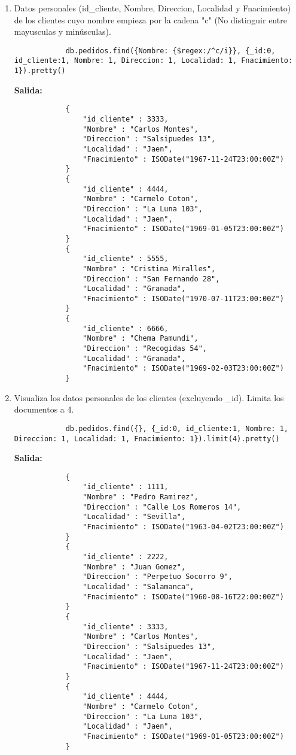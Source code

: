 \begin{enumerate}
	\item Datos personales (id\_cliente, Nombre, Direccion, Localidad y Fnacimiento) de los clientes cuyo nombre empieza por la cadena "c" (No distinguir entre mayusculas y minúsculas).
		\begin{lstlisting}
			db.pedidos.find({Nombre: {$regex:/^c/i}}, {_id:0, id_cliente:1, Nombre: 1, Direccion: 1, Localidad: 1, Fnacimiento: 1}).pretty()
		\end{lstlisting}
		\textbf{Salida:}
		\begin{lstlisting}
			{
				"id_cliente" : 3333,
				"Nombre" : "Carlos Montes",
				"Direccion" : "Salsipuedes 13",
				"Localidad" : "Jaen",
				"Fnacimiento" : ISODate("1967-11-24T23:00:00Z")
			}
			{
				"id_cliente" : 4444,
				"Nombre" : "Carmelo Coton",
				"Direccion" : "La Luna 103",
				"Localidad" : "Jaen",
				"Fnacimiento" : ISODate("1969-01-05T23:00:00Z")
			}
			{
				"id_cliente" : 5555,
				"Nombre" : "Cristina Miralles",
				"Direccion" : "San Fernando 28",
				"Localidad" : "Granada",
				"Fnacimiento" : ISODate("1970-07-11T23:00:00Z")
			}
			{
				"id_cliente" : 6666,
				"Nombre" : "Chema Pamundi",
				"Direccion" : "Recogidas 54",
				"Localidad" : "Granada",
				"Fnacimiento" : ISODate("1969-02-03T23:00:00Z")
			}
		\end{lstlisting}

	\item Visualiza los datos personales de los clientes (excluyendo \_id). Limita los documentos a 4.
		\begin{lstlisting}
			db.pedidos.find({}, {_id:0, id_cliente:1, Nombre: 1, Direccion: 1, Localidad: 1, Fnacimiento: 1}).limit(4).pretty()
		\end{lstlisting}
		\textbf{Salida:}
		\begin{lstlisting}
			{
				"id_cliente" : 1111,
				"Nombre" : "Pedro Ramirez",
				"Direccion" : "Calle Los Romeros 14",
				"Localidad" : "Sevilla",
				"Fnacimiento" : ISODate("1963-04-02T23:00:00Z")
			}
			{
				"id_cliente" : 2222,
				"Nombre" : "Juan Gomez",
				"Direccion" : "Perpetuo Socorro 9",
				"Localidad" : "Salamanca",
				"Fnacimiento" : ISODate("1960-08-16T22:00:00Z")
			}
			{
				"id_cliente" : 3333,
				"Nombre" : "Carlos Montes",
				"Direccion" : "Salsipuedes 13",
				"Localidad" : "Jaen",
				"Fnacimiento" : ISODate("1967-11-24T23:00:00Z")
			}
			{
				"id_cliente" : 4444,
				"Nombre" : "Carmelo Coton",
				"Direccion" : "La Luna 103",
				"Localidad" : "Jaen",
				"Fnacimiento" : ISODate("1969-01-05T23:00:00Z")
			}
		\end{lstlisting}


\end{enumerate}
